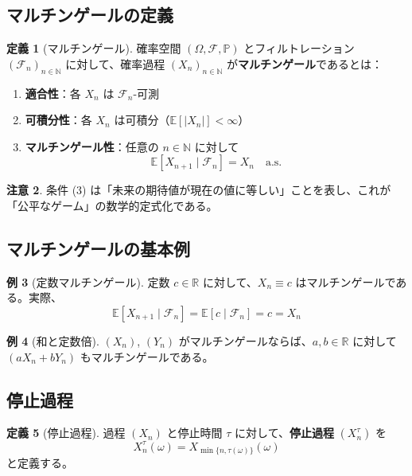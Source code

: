 \documentclass[a4paper,12pt]{article}
\theoremstyle{definition}
\newtheorem{definition}{定義}[section]
\newtheorem{example}[definition]{例}
\newtheorem{remark}[definition]{注意}
\begin{document}
\subsection{マルチンゲールの定義}

\begin{definition}[マルチンゲール]
確率空間 $(\Omega, \mathcal{F}, \mathbb{P})$ とフィルトレーション $(\mathcal{F}_n)_{n \in \mathbb{N}}$ に対して、確率過程 $(X_n)_{n \in \mathbb{N}}$ が\textbf{マルチンゲール}であるとは：
\begin{enumerate}
\item \textbf{適合性}：各 $X_n$ は $\mathcal{F}_n$-可測
\item \textbf{可積分性}：各 $X_n$ は可積分（$\mathbb{E}[|X_n|] < \infty$）
\item \textbf{マルチンゲール性}：任意の $n \in \mathbb{N}$ に対して
\[
\mathbb{E}[X_{n+1} \mid \mathcal{F}_n] = X_n \quad \text{a.s.}
\]
\end{enumerate}
\end{definition}

\begin{remark}
条件 (3) は「未来の期待値が現在の値に等しい」ことを表し、これが「公平なゲーム」の数学的定式化である。
\end{remark}

\subsection{マルチンゲールの基本例}

\begin{example}[定数マルチンゲール]
定数 $c \in \mathbb{R}$ に対して、$X_n \equiv c$ はマルチンゲールである。実際、
\[
\mathbb{E}[X_{n+1} \mid \mathcal{F}_n] = \mathbb{E}[c \mid \mathcal{F}_n] = c = X_n
\]
\end{example}

\begin{example}[和と定数倍]
$(X_n)$, $(Y_n)$ がマルチンゲールならば、$a, b \in \mathbb{R}$ に対して $(aX_n + bY_n)$ もマルチンゲールである。
\end{example}

\subsection{停止過程}

\begin{definition}[停止過程]
過程 $(X_n)$ と停止時間 $\tau$ に対して、\textbf{停止過程} $(X^\tau_n)$ を
\[
X^\tau_n(\omega) = X_{\min\{n, \tau(\omega)\}}(\omega)
\]
と定義する。
\end{definition}
\end{document}
